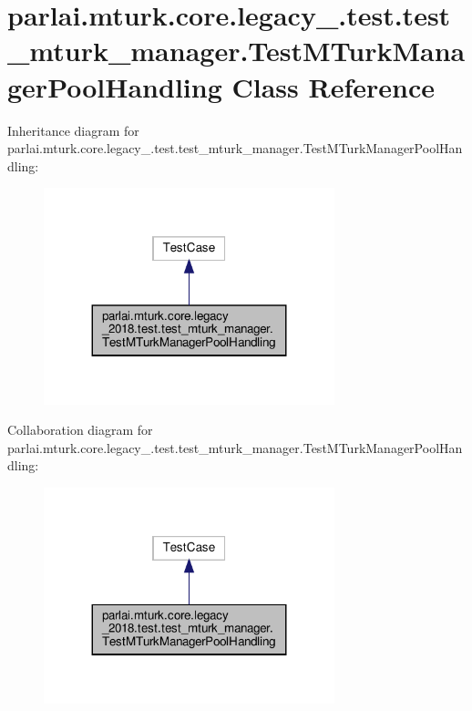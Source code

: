 \hypertarget{classparlai_1_1mturk_1_1core_1_1legacy__2018_1_1test_1_1test__mturk__manager_1_1TestMTurkManagerPoolHandling}{}\section{parlai.\+mturk.\+core.\+legacy\+\_.\+test.\+test\+\_\+mturk\+\_\+manager.\+Test\+M\+Turk\+Manager\+Pool\+Handling Class Reference}
\label{classparlai_1_1mturk_1_1core_1_1legacy__2018_1_1test_1_1test__mturk__manager_1_1TestMTurkManagerPoolHandling}


Inheritance diagram for parlai.\+mturk.\+core.\+legacy\+\_.\+test.\+test\+\_\+mturk\+\_\+manager.\+Test\+M\+Turk\+Manager\+Pool\+Handling\+:
\nopagebreak
\begin{figure}[H]
\begin{center}
\leavevmode
\includegraphics[width=239pt]{classparlai_1_1mturk_1_1core_1_1legacy__2018_1_1test_1_1test__mturk__manager_1_1TestMTurkManagerPoolHandling__inherit__graph}
\end{center}
\end{figure}


Collaboration diagram for parlai.\+mturk.\+core.\+legacy\+\_.\+test.\+test\+\_\+mturk\+\_\+manager.\+Test\+M\+Turk\+Manager\+Pool\+Handling\+:
\nopagebreak
\begin{figure}[H]
\begin{center}
\leavevmode
\includegraphics[width=239pt]{classparlai_1_1mturk_1_1core_1_1legacy__2018_1_1test_1_1test__mturk__manager_1_1TestMTurkManagerPoolHandling__coll__graph}
\end{center}
\end{figure}
